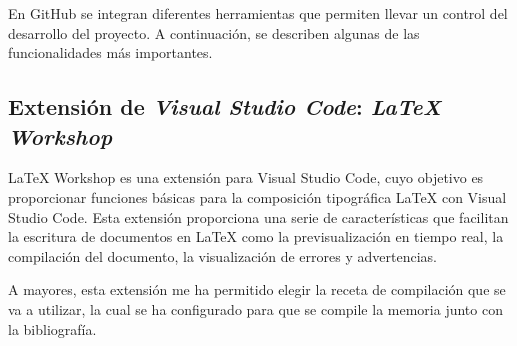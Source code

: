 En GitHub se integran diferentes herramientas que permiten llevar un control del desarrollo del proyecto. A continuación, se describen algunas de las funcionalidades más importantes.

\subsection{Extensión de \textit{Visual Studio Code}: \textit{LaTeX Workshop}}

LaTeX Workshop es una extensión para Visual Studio Code, cuyo objetivo es proporcionar funciones básicas para la composición tipográfica LaTeX con Visual Studio Code. Esta extensión proporciona una serie de características que facilitan la escritura de documentos en LaTeX como la previsualización en tiempo real, la compilación del documento, la visualización de errores y advertencias.

A mayores, esta extensión me ha permitido elegir la receta de compilación que se va a utilizar, la cual se ha configurado para que se compile la memoria junto con la bibliografía.

